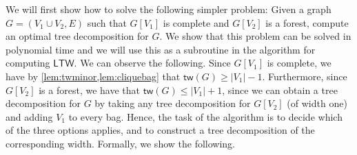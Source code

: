 \documentclass[a4paper,UKenglish,cleveref, autoref, thm-restate, numberwithinsect]{lipics-v2021}
\newcounter{algorithm}
\newcommand{\tw}{\mathsf{tw}}
\newcommand{\ltw}{\mathsf{LTW}}
\begin{document}
 
We will first show how to solve the following simpler problem: Given a graph $G=(V_1\cup V_2,E)$ such that $G[V_1]$ is complete and $G[V_2]$ is a forest, compute an optimal tree decomposition for $G$. We show that this problem can be solved in polynomial time and we will use this as a subroutine in the algorithm for computing $\ltw$. 
We can observe the following. Since $G[V_1]$ is complete, we have by \cref{lem:twminor,lem:cliquebag} that $\tw(G)\ge |V_1|-1$. Furthermore, since $G[V_2]$ is a forest, we have that $\tw(G)\le |V_1|+1$, since we can obtain a tree decomposition for $G$ by taking any tree decomposition for $G[V_2]$ (of width one) and adding $V_1$ to every bag. Hence, the task of the algorithm is to decide which of the three options applies, and to construct a tree decomposition of the corresponding width. Formally, we show the following.
\end{document}
